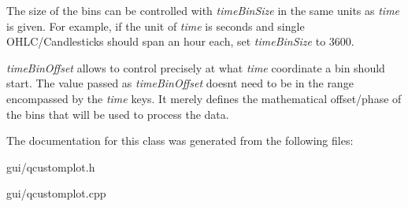 The size of the bins can be controlled with {\itshape time\+Bin\+Size} in the same units as {\itshape time} is given. For example, if the unit of {\itshape time} is seconds and single O\+H\+L\+C/\+Candlesticks should span an hour each, set {\itshape time\+Bin\+Size} to 3600.

{\itshape time\+Bin\+Offset} allows to control precisely at what {\itshape time} coordinate a bin should start. The value passed as {\itshape time\+Bin\+Offset} doesn\textquotesingle{}t need to be in the range encompassed by the {\itshape time} keys. It merely defines the mathematical offset/phase of the bins that will be used to process the data. 

The documentation for this class was generated from the following files\+:\begin{DoxyCompactItemize}
\item 
gui/qcustomplot.\+h\item 
gui/qcustomplot.\+cpp\end{DoxyCompactItemize}

